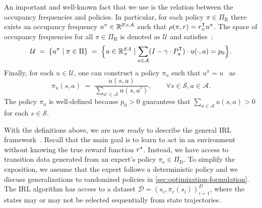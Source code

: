 \documentclass[10pt]{article}
\renewcommand{\cite}{\citep}
\theoremstyle{plain}
\theoremstyle{remark}
\begin{document}
An important and well-known fact that we use is the relation between the occupancy frequencies and policies. In particular, for each policy $\pi\in\Pi_{\mathrm{R}}$ there exists an occupancy frequency $u^{\pi}\in \mathbb{R}^{\mathcal{S}\times \mathcal{A}}$ such that $\rho(\pi, r) = r_{\pi}^{\mathsf{T}} u^{\pi}$. The space of occupancy frequencies for all $\pi\in \Pi_{\mathrm{R}}$
is denoted as $\mathcal{U}$ and satisfies~\cite[Section~6.9]{Puterman1994}:
\begin{equation} \label{eq:definition-u}
  \mathcal{U}
  \; =\; 
\left\{ u^{\pi} \mid  \pi \in \Pi \right\}
\; =\;
\Bigl\{ u\in \mathbb{R}^{SA}_{+} \mid \sum_{a\in \mathcal{A}} (I - \gamma\cdot P^{\mathsf{T}}_a) \cdot u(\cdot, a) = p_0 \Bigr\}.
\end{equation}
Finally, for each $u\in \mathcal{U}$, one can construct a policy $\pi_u$ such that $u^{\pi} = u$~\cite[Theorem~6.9.1]{Puterman1994} as
\begin{equation}\label{eq:policy-construction}
\pi_u(s, a) \; =\;  \frac{u(s,a)}{\sum_{a' \in \mathcal{A}} u(s,a')}, \qquad \forall s\in \mathcal{S}, a\in \mathcal{A}.
\end{equation}
The policy $\pi_{\mathrm{u}}$ is well-defined because $p_0 > 0$ guarantees that $\sum_{a\in \mathcal{A}} u(s,a) > 0$ for each $s\in \mathcal{S}$.


With the definitions above, we are now ready to describe the general IRL framework~\cite{abbeel2004,Syed2008,Ho2016}. Recall that the main goal is to learn to act in an environment without knowing the true reward function $r^{\mathnormal{\star}}$. Instead, we have access to transition data generated from an expert's policy $\pi_{\mathrm{e}} \in \Pi_{\mathrm{D}}$. To simplify the exposition, we assume that the expert follows a deterministic policy and we discuss generalizations to randomized policies in \cref{sec:optimization-formulation}. The IRL algorithm has access to a dataset  \( \mathcal{D} = {(s_i, \pi_e(s_i))}_{i=1}^D \), where the states may or may not be selected sequentially from state trajectories.
\end{document}

